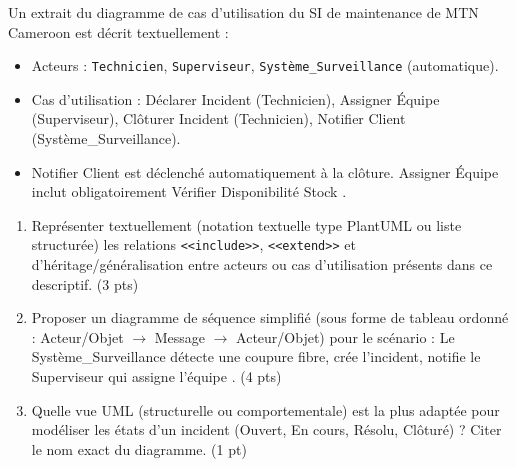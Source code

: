 \documentclass[11pt]{article}
\begin{document}
\begin{exercice}
Un extrait du diagramme de cas d'utilisation du SI de maintenance de MTN Cameroon est décrit textuellement :
\begin{itemize}
    \item Acteurs : \texttt{Technicien}, \texttt{Superviseur}, \texttt{Système\_Surveillance} (automatique).
    \item Cas d'utilisation : \og Déclarer Incident \fg{} (Technicien), \og Assigner Équipe \fg{} (Superviseur), \og Clôturer Incident \fg{} (Technicien), \og Notifier Client \fg{} (Système\_Surveillance).
    \item \og Notifier Client \fg{} est déclenché automatiquement à la clôture. \og Assigner Équipe \fg{} inclut obligatoirement \og Vérifier Disponibilité Stock \fg{}.
\end{itemize}

\begin{enumerate}
    \item Représenter textuellement (notation textuelle type PlantUML ou liste structurée) les relations \texttt{<<include>>}, \texttt{<<extend>>} et d'héritage/généralisation entre acteurs ou cas d'utilisation présents dans ce descriptif. \hfill (3 pts)
    \item Proposer un diagramme de séquence simplifié (sous forme de tableau ordonné : Acteur/Objet $\rightarrow$ Message $\rightarrow$ Acteur/Objet) pour le scénario : \og Le Système\_Surveillance détecte une coupure fibre, crée l'incident, notifie le Superviseur qui assigne l'équipe \fg{}. \hfill (4 pts)
    \item Quelle vue UML (structurelle ou comportementale) est la plus adaptée pour modéliser les états d'un incident (Ouvert, En cours, Résolu, Clôturé) ? Citer le nom exact du diagramme. \hfill (1 pt)
\end{enumerate}
\end{exercice}
\end{document}
